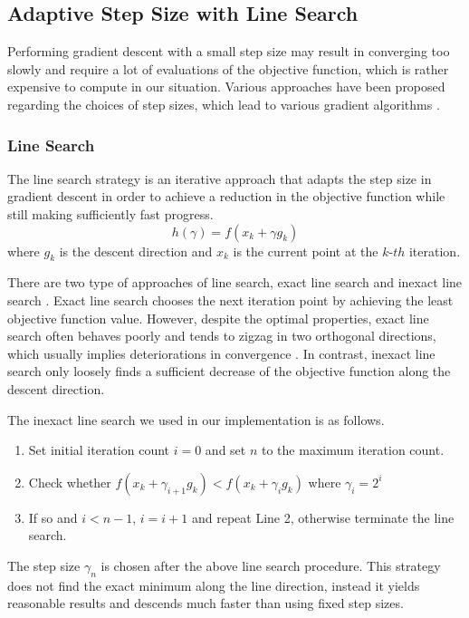 \subsection{Adaptive Step Size with Line Search}
Performing gradient descent with a small step size may result in converging too slowly and require a lot of evaluations of the objective function, which is rather expensive to compute in our situation. Various approaches have been proposed regarding the choices of step sizes, which lead to various gradient algorithms \cite{yuan_step-sizes_2008}.

\subsubsection{Line Search}
The line search strategy is an iterative approach that adapts the step size in gradient descent in order to achieve a reduction in the objective function while still making sufficiently fast progress.
\[ h( \gamma)=f(x_{k}+\gamma g_{k}) \]
where $ g_{k} $ is the descent direction and $ x_{k} $ is the current point at the $ k$-$th $ iteration.

There are two type of approaches of line search, exact line search and inexact line search \cite{vrahatis_class_2000}.
Exact line search chooses the next iteration point by achieving the least objective function value. However, despite the optimal properties, exact line search often behaves poorly and tends to zigzag in two orthogonal directions, which usually implies deteriorations in convergence \cite{zhou_gradient_2006}.
In contrast, inexact line search only loosely finds a sufficient decrease of the objective function along the descent direction.

The inexact line search we used in our implementation is as follows.

\begin{enumerate}
	\item Set initial iteration count $ i=0 $ and set $ n $ to the maximum iteration count.
	\item Check whether $ f(x_{k}+\gamma_{i+1} g_{k}) < f(x_{k}+\gamma_{i} g_{k}) $ where $ \gamma_{i}=2^{i} $
	\item If so and $ i<n-1 $, $ i=i+1 $ and repeat Line 2, otherwise terminate the line search.
\end{enumerate}

The step size $ \gamma_{n} $ is chosen after the above line search procedure.
This strategy does not find the exact minimum along the line direction, instead it yields reasonable results and descends much faster than using fixed step sizes.

